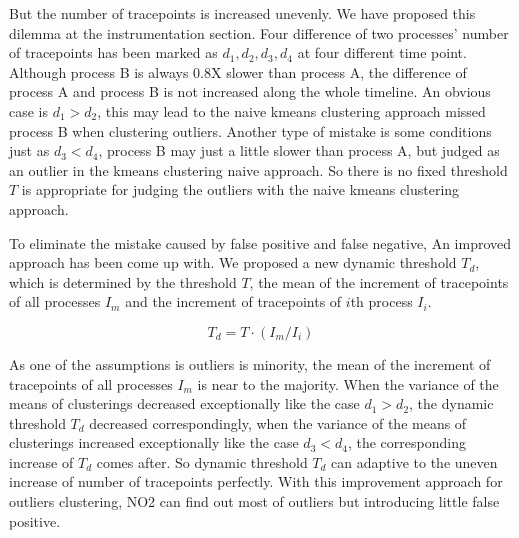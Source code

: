 But the number of tracepoints is increased unevenly. We have proposed this dilemma at the instrumentation section. Four difference of two processes' number of tracepoints has been marked as $d_1, d_2, d_3, d_4$ at four different time point. Although process B is always 0.8X slower than process A, the difference of process A and process B is not increased along the whole timeline. An obvious case is $d_1 > d_2$, this may lead to the naive kmeans clustering approach missed process B when clustering outliers. Another type of mistake is some conditions just as $d_3 < d_4$, process B may just a little slower than process A, but judged as an outlier in the kmeans clustering naive approach. So there is no fixed threshold $T$ is appropriate for judging the outliers with the naive kmeans clustering approach.

To eliminate the mistake caused by false positive and false negative, An improved approach has been come up with. We proposed a new dynamic threshold $T_d$, which is determined by the threshold $T$, the mean of the increment of tracepoints of all processes $I_m$ and the increment of tracepoints of $i$th process $I_i$.

$$T_d = T \cdot (I_m / I_i)$$

As one of the assumptions is outliers is minority, the mean of the increment of tracepoints of all processes $I_m$ is near to the majority. When the variance of the means of clusterings decreased exceptionally like the case $d_1 > d_2$, the dynamic threshold $T_d$ decreased correspondingly, when the variance of the means of clusterings increased exceptionally like the case $d_3 < d_4$, the corresponding increase of $T_d$ comes after. So dynamic threshold $T_d$ can adaptive to the uneven increase of number of tracepoints perfectly. With this improvement approach for outliers clustering, NO2 can find out most of outliers but introducing little false positive.